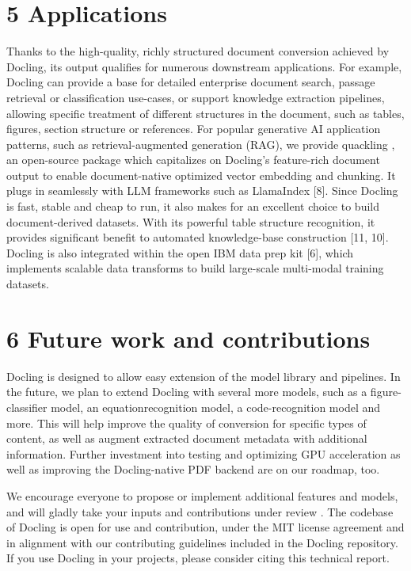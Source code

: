 \documentclass[11pt,a4paper]{article}
\begin{document}
\section{5 Applications}

Thanks to the high-quality, richly structured document conversion achieved by Docling, its output qualifies for numerous downstream applications. For example, Docling can provide a base for detailed enterprise document search, passage retrieval or classification use-cases, or support knowledge extraction pipelines, allowing specific treatment of different structures in the document, such as tables, figures, section structure or references. For popular generative AI application patterns, such as retrieval-augmented generation (RAG), we provide quackling , an open-source package which capitalizes on Docling's feature-rich document output to enable document-native optimized vector embedding and chunking. It plugs in seamlessly with LLM frameworks such as LlamaIndex [8]. Since Docling is fast, stable and cheap to run, it also makes for an excellent choice to build document-derived datasets. With its powerful table structure recognition, it provides significant benefit to automated knowledge-base construction [11, 10]. Docling is also integrated within the open IBM data prep kit [6], which implements scalable data transforms to build large-scale multi-modal training datasets.

\section{6 Future work and contributions}

Docling is designed to allow easy extension of the model library and pipelines. In the future, we plan to extend Docling with several more models, such as a figure-classifier model, an equationrecognition model, a code-recognition model and more. This will help improve the quality of conversion for specific types of content, as well as augment extracted document metadata with additional information. Further investment into testing and optimizing GPU acceleration as well as improving the Docling-native PDF backend are on our roadmap, too.

We encourage everyone to propose or implement additional features and models, and will gladly take your inputs and contributions under review . The codebase of Docling is open for use and contribution, under the MIT license agreement and in alignment with our contributing guidelines included in the Docling repository. If you use Docling in your projects, please consider citing this technical report.
\end{document}
